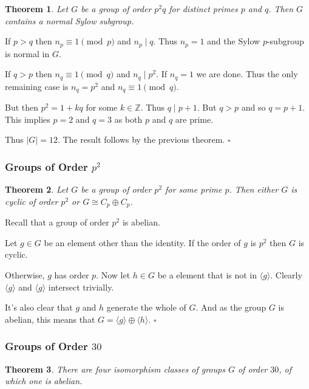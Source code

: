 \documentclass[10pt]{article}
\newtheorem{theorem}{Theorem}[section]
\newenvironment{proof}[1][Proof]{\begin{trivlist}
\item[\hskip \labelsep {\itshape #1}]}{\end{trivlist}}
\begin{document}
\begin{theorem}
Let $G$ be a group of order $p^2q$ for distinct primes $p$ and $q$. Then $G$ contains a normal Sylow subgroup.
\end{theorem}

\begin{proof}
If $p > q$ then $n_p \equiv 1 \pmod{p}$ and $n_p \;|\; q$. Thus $n_p = 1$ and the Sylow $p$-subgroup is normal in $G$.

If $q > p$ then $n_q \equiv 1 \pmod{q}$ and $n_q \;|\; p^2$. If $n_q = 1$ we are done. Thus the only remaining case is $n_q = p^2$ and $n_q \equiv 1 \pmod{q}$.

But then $p^2 = 1 + kq$ for some $k \in \mathbb{Z}$. Thus $q \;|\; p + 1$. But $q > p$ and so $q = p + 1$. This implies $p = 2$ and $q = 3$ as both $p$ and $q$ are prime.

Thus $|G| = 12$. The result follows by the previous theorem. $\square$
\end{proof}

\subsubsection{Groups of Order $p^2$}

\begin{theorem}
Let $G$ be a group of order $p^2$ for some prime $p$. Then either $G$ is cyclic of order $p^2$ or $G \cong C_p\oplus C_p$.
\end{theorem}

\begin{proof}
Recall that a group of order $p^2$ is abelian.

Let $g \in G$ be an element other than the identity. If the order of $g$ is $p^2$ then $G$ is cyclic.

Otherwise, $g$ has order $p$. Now let $h \in G$ be a element that is not in $\langle g \rangle$. Clearly $\langle g \rangle$ and $\langle g \rangle$ intersect trivially.

It's also clear that $g$ and $h$ generate the whole of $G$. And as the group $G$ is abelian, this means that $G = \langle g \rangle \oplus \langle h \rangle$. $\square$
\end{proof}

\subsubsection{Groups of Order $30$}

\begin{theorem}
There are four isomorphism classes of groups $G$ of order $30$, of which one is abelian.
\end{theorem}
\end{document}
